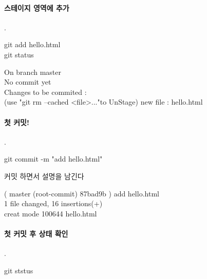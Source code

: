 \documentclass[12pt, a4paper, oneside]{book}
\begin{document}
\paragraph{스테이지 영역에 추가}
		.\\

			\begin{tcolorbox}		[
									title=스테이지 영역에 추가
									]
									git add hello.html \\
									git status
			\end{tcolorbox}


		\begin{tcolorbox}
			On branch master \\
			No commit yet \\
			Changes to be commited :\\
			(use "git rm --cached <file>..."to UnStage)
			new file : hello.html
		\end{tcolorbox}

\paragraph{첫 커밋!}
		.\\

			\begin{tcolorbox}		[
									title=첫 커밋!
									]
									git commit -m "add hello.html"
			\end{tcolorbox}
			커밋 하면서 설명을 남긴다

		\begin{tcolorbox}
			( master (root-commit) 87bad9b ) add hello.html\\
			1 file changed, 16 insertions(+) \\
			creat mode 100644 hello.html
		\end{tcolorbox}
		

\paragraph{첫 커밋 후 상태 확인}
		.\\

			\begin{tcolorbox}		[
									title=첫 커밋 후 상태 확인
									]
									git ststus
			\end{tcolorbox}
\end{document}
